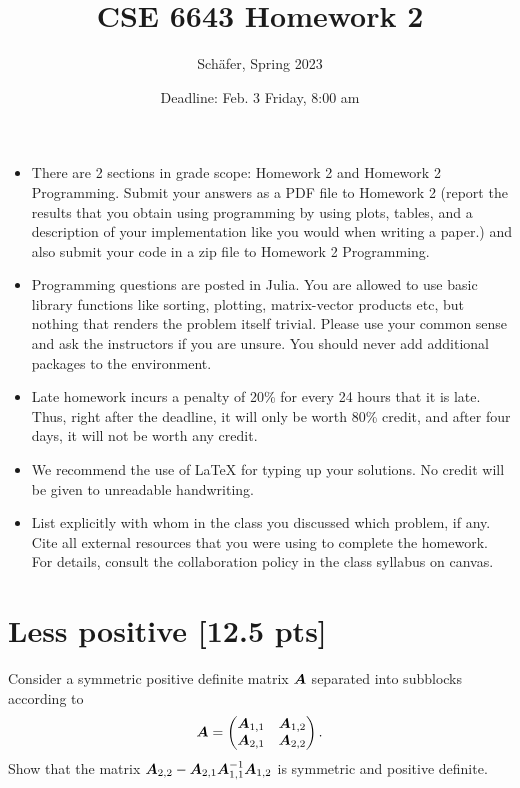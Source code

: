 \documentclass[twoside,10pt]{article}
\begin{document}
\title{CSE 6643 Homework 2}
\author{Sch{\"a}fer, Spring 2023}
\date{Deadline: Feb. 3 Friday, 8:00 am}
\maketitle

\begin{itemize}
  \item There are 2 sections in grade scope: Homework 2 and Homework 2 Programming. Submit your answers as a PDF file to Homework 2 (report the results that you obtain using programming by using plots, tables, and a description of your implementation like you would when writing a paper.) and also submit your code in a zip file to Homework 2 Programming. 
  \item Programming questions are posted in Julia. You are allowed to use basic library functions like sorting, plotting, matrix-vector products etc, but nothing that renders the problem itself trivial. Please use your common sense and ask the instructors if you are unsure. 
  You should never add additional packages to the environment.
  \item Late homework incurs a penalty of 20\% for every 24 hours that it is late. Thus, right after the deadline, it will only be worth 80\% credit, and after four days, it will not be worth any credit. 
  \item We recommend the use of LaTeX for typing up your solutions. No credit will be given to unreadable handwriting.
  \item List explicitly with whom in the class you discussed which problem, if any. Cite all external resources that you were using to complete the homework. For details, consult the collaboration policy in the class syllabus on canvas.
\end{itemize}

\section{Less positive [12.5 pts]} 
Consider a symmetric positive definite matrix $\bm{A}$ separated into subblocks according to
\begin{equation*}
  \bm{A} = \begin{pmatrix}
    \bm{A}_{1, 1} & \bm{A}_{1, 2} \\
    \bm{A}_{2, 1} & \bm{A}_{2, 2}
  \end{pmatrix}.
\end{equation*}
Show that the matrix $\bm{A}_{2,2} - \bm{A}_{2,1} \bm{A}_{1,1}^{-1} \bm{A}_{1,2}$ is symmetric and positive definite. 
\end{document}
